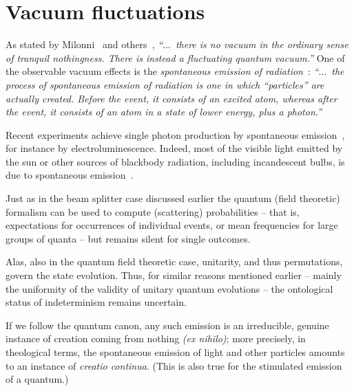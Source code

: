 \chapter{Vacuum fluctuations}
\label{2016-pu-book-chapter-vf} %

As stated by Milonni~\cite[p.~xiii]{milonni-book} and others~\cite{einstein-aether,dirac-aether}, {\em ``$\ldots$~there is no vacuum in the ordinary sense of
tranquil nothingness. There is instead a fluctuating quantum vacuum.''}
One of the observable vacuum effects is the {\em spontaneous emission of radiation}~\cite{Weinberg-search}:
{\em ``$\ldots$~the process of spontaneous emission of radiation is one in which ``particles'' are actually created.
Before the event, it consists of an excited atom, whereas after the event, it consists of an atom in a state of lower energy, plus a photon.''}

Recent experiments achieve single photon production by spontaneous emission~\cite{PhysRevLett.39.691,PhysRevLett.85.290,Buckley-12,Stevenson-spontemi,Sanguinetti},
for instance by electroluminescence.
Indeed, most of the visible light emitted by the sun or other sources of blackbody radiation, including incandescent bulbs,
is due to spontaneous emission~\cite[p.~78]{milonni-book}.

Just as in the beam splitter case discussed earlier the quantum (field theoretic) formalism can be used
to compute (scattering) probabilities
--
that is, expectations for occurrences of individual events,
or mean frequencies for large groups of quanta
--
but remains silent for single outcomes.

Alas, also in the quantum field theoretic case,
unitarity, and thus permutations, govern the state evolution.
Thus, for similar reasons mentioned earlier -- mainly the uniformity of
the validity of unitary quantum evolutions
-- the ontological status of indeterminism remains uncertain.


If we follow the quantum canon, any such emission is an irreducible, genuine instance of
creation coming from nothing {\it (ex nihilo)}; more precisely, in theological terms, the spontaneous emission of light
and other particles amounts to an instance of
{\it creatio continua}.
(This is also true for the stimulated emission of a quantum.)



